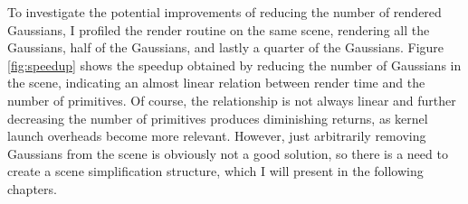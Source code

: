 \begin{figure}[H]
\end{figure}

To investigate the potential improvements of reducing the number of rendered Gaussians, I profiled the render routine on the same scene, rendering all the Gaussians, half of the Gaussians, and lastly a quarter of the Gaussians. Figure \ref{fig:speedup} shows the speedup obtained by reducing the number of Gaussians in the scene, indicating an almost linear relation between render time and the number of primitives. Of course, the relationship is not always linear and further decreasing the number of primitives produces diminishing returns, as kernel launch overheads become more relevant. However, just arbitrarily removing Gaussians from the scene is obviously not a good solution, so there is a need to create a scene simplification structure, which I will present in the following chapters.
